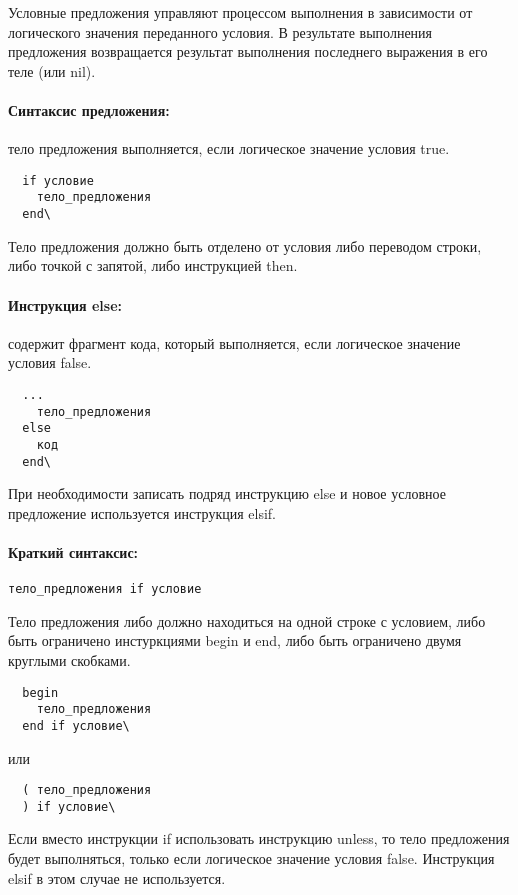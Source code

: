 Условные предложения управляют процессом выполнения в зависимости от логического значения переданного условия. В результате выполнения предложения возвращается результат выполнения последнего выражения в его теле (или nil).

\paragraph*{Синтаксис предложения:} тело предложения выполняется, если логическое значение условия true.

\begin{verbatim}
  if условие
    тело_предложения
  end\
\end{verbatim}

Тело предложения должно быть отделено от условия либо переводом строки, либо точкой с запятой, либо инструкцией then.

\paragraph*{Инструкция else:} содержит фрагмент кода, который выполняется, если логическое значение условия false.

\begin{verbatim}
  ...
    тело_предложения
  else
    код
  end\
\end{verbatim}

При необходимости записать подряд инструкцию else и новое условное предложение используется инструкция elsif.

\paragraph*{Краткий синтаксис:} \verb!тело_предложения if условие!

Тело предложения либо должно находиться на одной строке с условием, либо быть ограничено инстуркциями begin и end, либо быть ограничено двумя круглыми скобками.
\begin{verbatim}
  begin
    тело_предложения
  end if условие\
\end{verbatim}
или
\begin{verbatim}
  ( тело_предложения
  ) if условие\
\end{verbatim}

Если вместо инструкции if использовать инструкцию unless, то тело предложения будет выполняться, только если логическое значение условия false. Инструкция elsif в этом случае не используется.

